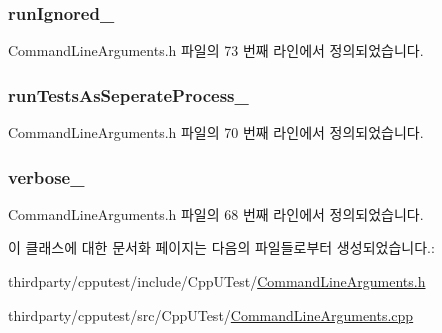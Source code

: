 \subsubsection[{\texorpdfstring{run\+Ignored\+\_\+}{runIgnored_}}]{ run\+Ignored\+\_\+\hspace{0.3cm}{\ttfamily [private]}}\hypertarget{class_command_line_arguments_a9aedd4f11eb25d8bd013c2463fccfea6}{}\label{class_command_line_arguments_a9aedd4f11eb25d8bd013c2463fccfea6}


Command\+Line\+Arguments.\+h 파일의 73 번째 라인에서 정의되었습니다.

\subsubsection[{\texorpdfstring{run\+Tests\+As\+Seperate\+Process\+\_\+}{runTestsAsSeperateProcess_}}]{ run\+Tests\+As\+Seperate\+Process\+\_\+\hspace{0.3cm}{\ttfamily [private]}}\hypertarget{class_command_line_arguments_a5c5869542e7f90a7ece33a6962c8bf88}{}\label{class_command_line_arguments_a5c5869542e7f90a7ece33a6962c8bf88}


Command\+Line\+Arguments.\+h 파일의 70 번째 라인에서 정의되었습니다.

\subsubsection[{\texorpdfstring{verbose\+\_\+}{verbose_}}]{ verbose\+\_\+\hspace{0.3cm}{\ttfamily [private]}}\hypertarget{class_command_line_arguments_a86126da532c138842a42d8e9a52b0806}{}\label{class_command_line_arguments_a86126da532c138842a42d8e9a52b0806}


Command\+Line\+Arguments.\+h 파일의 68 번째 라인에서 정의되었습니다.



이 클래스에 대한 문서화 페이지는 다음의 파일들로부터 생성되었습니다.\+:\begin{DoxyCompactItemize}
\item 
thirdparty/cpputest/include/\+Cpp\+U\+Test/\hyperlink{_command_line_arguments_8h}{Command\+Line\+Arguments.\+h}\item 
thirdparty/cpputest/src/\+Cpp\+U\+Test/\hyperlink{_command_line_arguments_8cpp}{Command\+Line\+Arguments.\+cpp}\end{DoxyCompactItemize}
